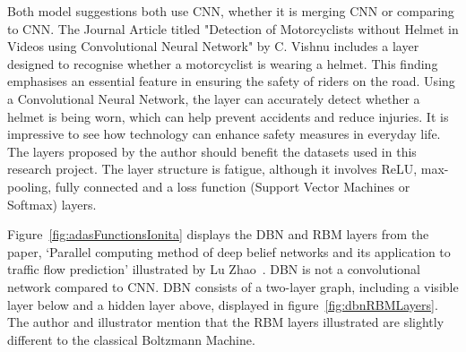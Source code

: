 \documentclass[12pt]{report} %
\begin{document}
		Both model suggestions both use CNN, whether it is merging CNN or comparing to CNN. The Journal Article titled "Detection of Motorcyclists without Helmet in Videos using Convolutional Neural Network" by C. Vishnu includes a layer designed to recognise whether a motorcyclist is wearing a helmet. This finding emphasises an essential feature in ensuring the safety of riders on the road. Using a Convolutional Neural Network, the layer can accurately detect whether a helmet is being worn, which can help prevent accidents and reduce injuries. It is impressive to see how technology can enhance safety measures in everyday life. The layers proposed by the author should benefit the datasets used in this research project. The layer structure is fatigue, although it involves ReLU, max-pooling, fully connected and a loss function (Support Vector Machines or Softmax) layers.
        
        Figure~\ref{fig:adasFunctionsIonita} displays the DBN and RBM layers from the paper, `Parallel computing method of deep belief networks and its application to traffic flow prediction' illustrated by Lu Zhao~\cite{zhao_parallel_2019}. DBN is not a convolutional network compared to CNN. DBN consists of a two-layer graph, including a visible layer below and a hidden layer above, displayed in figure~\ref{fig:dbnRBMLayers}. The author and illustrator mention that the RBM layers illustrated are slightly different to the classical Boltzmann Machine.~\cite{zhao_parallel_2019}
\end{document}
